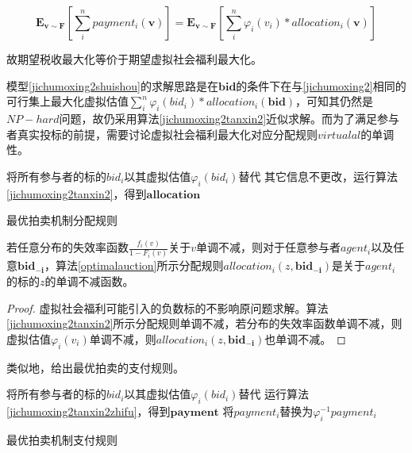\documentclass[promaster]{thesis-uestc}
\begin{document}
\begin{equation}
    \mathbf{E}_{\mathbf{v}\sim\mathbf{F}}{\left[\sum_{i}^{n}{payment_i(\mathbf{v})}\right]}=\mathbf{E}_{\mathbf{v}\sim\mathbf{F}}{\left[\sum_{i}^{n}{\varphi _i(v_i)*allocation_i(\mathbf{v})}\right]}
\end{equation}

故期望税收最大化等价于期望虚拟社会福利最大化。

模型\ref{jichumoxing2shuishou}的求解思路是在$\mathbf{bid}$的条件下在与\ref{jichumoxing2}相同的可行集上最大化虚拟估值$\sum_{i}^{n}{\varphi _i(bid_i)*allocation_i(\mathbf{bid})}$，可知其仍然是$NP-hard$问题，故仍采用算法\ref{jichumoxing2tanxin2}近似求解。而为了满足参与者真实投标的前提，需要讨论虚拟社会福利最大化对应分配规则$virtualal$的单调性。

\begin{algorithm}[H] 
    将所有参与者的标的$bid_i$以其虚拟估值$\varphi _i(bid_i)$替代\;
    其它信息不更改，运行算法\ref{jichumoxing2tanxin2}，得到$\mathbf{allocation}$\;
\caption{最优拍卖机制分配规则}
\label{optimalauction}
\end{algorithm}

\begin{theorem}
若任意分布的失效率函数$\frac{f_i(v)}{1-F_i(v)}$关于$v$单调不减，则对于任意参与者$agent_i$以及任意$\mathbf{bid_{-i}}$，算法\ref{optimalauction}所示分配规则$allocation_i(z,\mathbf{bid_{-i}})$是关于$agent_i$的标的$z$的单调不减函数。
\end{theorem}

\begin{proof}
虚拟社会福利可能引入的负数标的不影响原问题求解。算法\ref{jichumoxing2tanxin2}所示分配规则单调不减，若分布的失效率函数单调不减，则虚拟估值$\varphi _i(v_i)$单调不减，则$allocation_i(z,\mathbf{bid_{-i}})$也单调不减。
\end{proof}

类似地，给出最优拍卖的支付规则。

\begin{algorithm}[H] 
    将所有参与者的标的$bid_i$以其虚拟估值$\varphi _i(bid_i)$替代\;
    运行算法\ref{jichumoxing2tanxin2zhifu}，得到$\mathbf{payment}$\;
    {
        将$payment_i$替换为$\varphi _{i}^{-1}{payment_i}$
    }
\caption{最优拍卖机制支付规则}
\label{optimalauctionzhifu}
\end{algorithm}

\FloatBarrier
\end{document}
